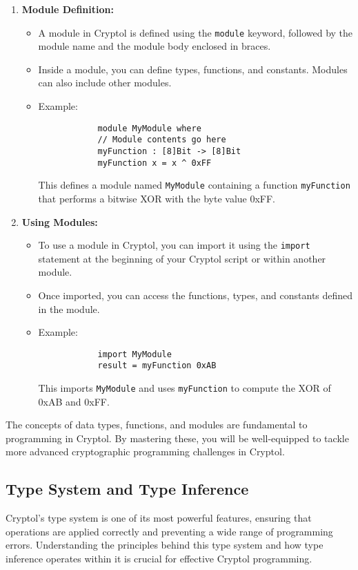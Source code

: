 \begin{enumerate}
	\item \textbf{Module Definition:}
	\begin{itemize}
		\item A module in Cryptol is defined using the \texttt{module} keyword, followed by the module name and the module body enclosed in braces.
		\item Inside a module, you can define types, functions, and constants. Modules can also include other modules.
		\item Example:
		\begin{verbatim}
			module MyModule where
			// Module contents go here
			myFunction : [8]Bit -> [8]Bit
			myFunction x = x ^ 0xFF
		\end{verbatim}
		This defines a module named \texttt{MyModule} containing a function \texttt{myFunction} that performs a bitwise XOR with the byte value 0xFF.
	\end{itemize}
	
	\item \textbf{Using Modules:}
	\begin{itemize}
		\item To use a module in Cryptol, you can import it using the \texttt{import} statement at the beginning of your Cryptol script or within another module.
		\item Once imported, you can access the functions, types, and constants defined in the module.
		\item Example:
		\begin{verbatim}
			import MyModule
			result = myFunction 0xAB
		\end{verbatim}
		This imports \texttt{MyModule} and uses \texttt{myFunction} to compute the XOR of 0xAB and 0xFF.
	\end{itemize}
\end{enumerate}

The concepts of data types, functions, and modules are fundamental to programming in Cryptol. By mastering these, you will be well-equipped to tackle more advanced cryptographic programming challenges in Cryptol.

\subsection{Type System and Type Inference}

Cryptol's type system is one of its most powerful features, ensuring that operations are applied correctly and preventing a wide range of programming errors. Understanding the principles behind this type system and how type inference operates within it is crucial for effective Cryptol programming.

